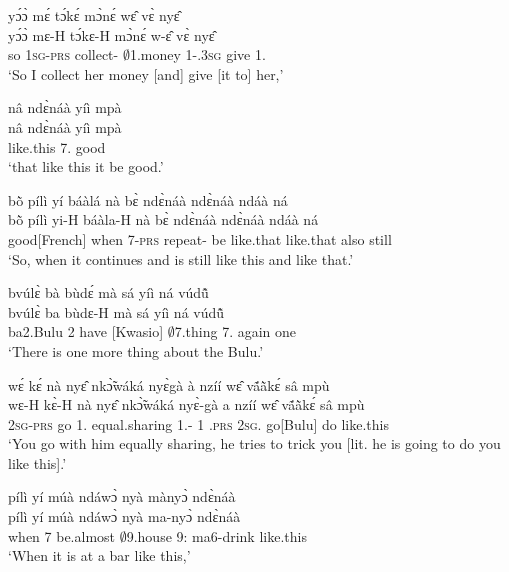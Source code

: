 \begin{exe}[(C234)]
\exC\label{118}
  \glll  yɔ́ɔ̀ mɛ́ tɔ́kɛ́ mɔ̀nɛ́ wɛ̂ vɛ̀ nyɛ̂ \\
         yɔ́ɔ̀ mɛ-H tɔ́kɛ-H mɔ̀nɛ́ w-ɛ̂ vɛ̀ nyɛ̂ \\
         so 1\textsc{sg}-\textsc{prs} collect-{\R} $\emptyset$1.money 1-{\POSS}.3\textsc{sg} give 1.{\OBJ}  \\
    \trans `So I collect her money [and] give [it to] her,'
 
\exC\label{119}
  \glll  nâ ndɛ̀náà  yíì mpà \\
      nâ ndɛ̀náà  yíì mpà \\
          {\COMP} like.this 7.{\COP} good  \\
    \trans `that like this it be good.'
 
\exC\label{120}
  \glll  bõ̀ pílì yí báàlá nà bɛ̀ ndɛ̀náà ndɛ̀náà ndáà ná\\
        bõ̀ pílì yi-H báàla-H nà bɛ̀ ndɛ̀náà ndɛ̀náà ndáà ná\\
          good[French] when 7-\textsc{prs} repeat-{\R} {\CONJ} be like.that like.that also still\\
    \trans `So, when it continues and is still like this and like that.'
 
\exC\label{121}
  \glll bvúlɛ̀ bà bùdɛ́ mà sá yíì ná vúdũ̂ \\
         bvúlɛ̀ ba bùdɛ-H mà sá yíì ná vúdũ̂ \\
         ba2.Bulu 2 have {\COMPL}[Kwasio] $\emptyset$7.thing 7.{\COP} again one   \\
    \trans `There is one more thing about the Bulu.'
 
\exC\label{122} 
  \glll wɛ́ kɛ́ nà nyɛ̂ nkɔ̃̀wáká nyɛ̀gà à nzíí wɛ̂ vã́ã̀kɛ́ sâ mpù \\
         wɛ-H kɛ̀-H nà nyɛ̂ nkɔ̃̀wáká nyɛ̀-gà a nzíí wɛ̂ vã́ã̀kɛ́ sâ mpù \\
         2\textsc{sg}-\textsc{prs} go {\COM} 1.{\OBJ} equal.sharing 1.{\SBJ}-{\CONTR} 1 {\PROG}.\textsc{prs} 2\textsc{sg}.{\OBJ} go[Bulu] do like.this  \\
    \trans `You go with him equally sharing, he tries to trick you [lit. he is going to do you like this].'
 
\exC\label{123}
  \glll  pílì yí múà ndáwɔ̀ nyà mànyɔ̀ ndɛ̀náà \\
      pílì yí múà ndáwɔ̀ nyà ma-nyɔ̀ ndɛ̀náà \\
         when 7 be.almost $\emptyset$9.house 9:{\ATT}  ma6-drink like.this   \\
    \trans `When it is at a bar like this,'
 

\end{exe}
